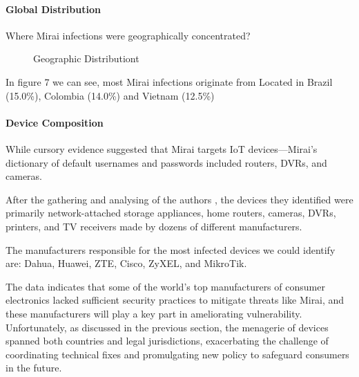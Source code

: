 \documentclass[conference]{IEEEtran}
\begin{document}
\paragraph{\textbf{Global Distribution}}
Where Mirai infections were geographically
concentrated?

\begin{figure}[htbp]
\caption{Geographic Distributiont\cite{b1}}
\label{fig}
\end{figure}

In figure 7 we can see, most Mirai infections originate from
Located in Brazil (15.0\%), Colombia (14.0\%) and
Vietnam (12.5\%)

\paragraph{\textbf{Device Composition}}

While cursory evidence suggested that Mirai targets IoT
devices—Mirai’s dictionary of default usernames and
passwords included routers, DVRs, and cameras.

After the gathering and analysing of the authors \cite{b1}, the devices they identified were primarily
network-attached storage appliances, home routers, cameras,
DVRs, printers, and TV receivers made by dozens
of different manufacturers.

The manufacturers responsible
for the most infected devices we could identify are:
Dahua, Huawei, ZTE, Cisco, ZyXEL, and MikroTik.

The data indicates that some of the world’s top manufacturers
of consumer electronics lacked sufficient security
practices to mitigate threats like Mirai, and these
manufacturers will play a key part in ameliorating vulnerability.
Unfortunately, as discussed in the previous
section, the menagerie of devices spanned both countries
and legal jurisdictions, exacerbating the challenge of coordinating
technical fixes and promulgating new policy to
safeguard consumers in the future.
\end{document}
